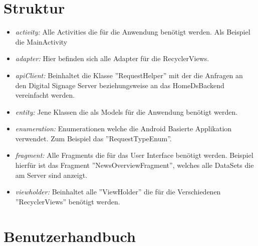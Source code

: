 \section{Struktur}
\begin{itemize}
	\item {\em activity:} Alle Activities die für die Anwendung benötigt werden. Als Beispiel die MainActivity
	
	\item {\em adapter:} Hier befinden sich alle Adapter für die RecyclerViews.
	
	\item {\em apiClient:} Beinhaltet die Klasse ''RequestHelper'' mit der die Anfragen an den Digital Signage Server beziehungsweise an das HomeDsBackend vereinfacht werden.
	
	\item {\em entity:} Jene Klassen die als Models für die Anwendung benötigt werden. 
		
	\item {\em enumeration:} Enumerationen welche die Android Basierte Applikation verwendet. Zum Beispiel das ''RequestTypeEnum''.
	
	\item {\em fragment:} Alle Fragments die für das User Interface benötigt werden. Beispiel hierfür ist das Fragment ''NewsOverviewFragment'', welches alle DataSets die am Server sind anzeigt.
	
	\item {\em viewholder:} Beinhaltet alle ''ViewHolder'' die für die Verschiedenen ''RecyclerViews'' benötigt werden. 		
\end{itemize}
\section{Benutzerhandbuch}
